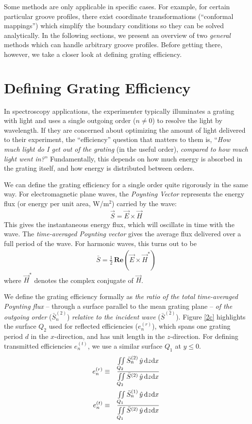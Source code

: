 Some methods are only applicable in specific cases.  For example, for certain particular groove profiles, there exist coordinate transformations (``conformal mappings'') which simplify the boundary conditions so they can be solved analytically.  In the following sections, we present an overview of two \emph{general} methods which can handle arbitrary groove profiles.  Before getting there, however, we take a closer look at defining grating efficiency.

\section{Defining Grating Efficiency}
In spectroscopy applications, the experimenter typically illuminates a grating with light and uses a single outgoing order ($n\neq0$) to resolve the light by wavelength.  If they are concerned about optimizing the amount of light delivered to their experiment, the ``efficiency'' question that matters to them is, ``\emph{How much light do I get out of the grating} (in the useful order), \emph{compared to how much light went in?}''  Fundamentally, this depends on how much energy is absorbed in the grating itself, and how energy is distributed between orders.

We can define the grating efficiency for a single order quite rigorously in the same way.  For electromagnetic plane waves, the \emph{Poynting Vector} represents the energy flux (or energy per unit area, W/m$^2$) carried by the wave:
\begin{eqnarray}
\vec S = \vec E \times \vec H
\end{eqnarray}
This gives the instantaneous energy flux, which will oscillate in time with the wave.  The \emph{time-averaged Poynting vector} gives the average flux delivered over a full period of the wave.  For harmonic waves, this turns out to be
\begin{eqnarray}
 \bar S  = \frac{1}{2}\, \mathbf{Re} \left( \vec E \times \vec H^\ast \right)
\end{eqnarray}
where $\vec H^\ast$ denotes the complex conjugate of $\vec H$.

We define the grating efficiency formally as \emph{the ratio of the total time-averaged Poynting flux} -- through a surface parallel to the mean grating plane -- \emph{of the outgoing order }($\bar S_n^{(2)}$) \emph{relative to the incident wave} ($\bar S^{(2)}$).  Figure \ref{2c} highlights the surface $Q_2$ used for reflected efficiencies ($e_n^{(r)}$), which spans one grating period $d$ in the $x$-direction, and has unit length in the $z$-direction.  For defining transmitted efficiencies $e_n^{(t)}$, we use a similar surface $Q_1$ at $y\leq0$.
\begin{eqnarray}
e_n^{(r)} &\equiv& \frac{\iint \limits_{Q_2} \bar S_n^{(2)} \, \hat y \, \mathrm{d} z \mathrm{d} x}{ \iint \limits_{Q_2} \bar S^{(2)} \, \hat y \, \mathrm{d} z \mathrm{d} x} \\
e_n^{(t)} &\equiv&\frac{\iint \limits_{Q_1} \bar S_n^{(1)}\, \hat y \, \mathrm{d} z \mathrm{d} x}{ \iint \limits_{Q_1} \bar S^{(2)}\, \hat y \, \mathrm{d} z \mathrm{d} x}
\end{eqnarray}
          
